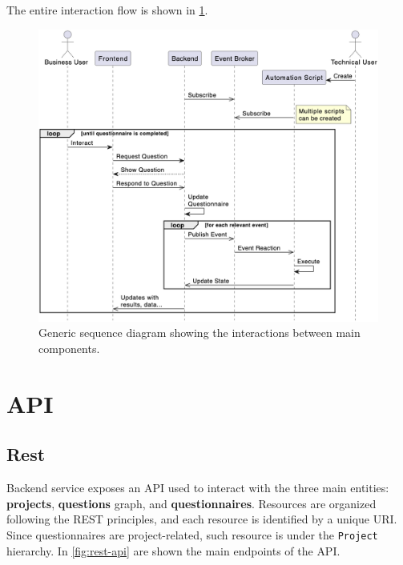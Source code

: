 \documentclass[12pt,a4paper,openright,twoside]{book}
\begin{document}
The entire interaction flow is shown in \cref{fig:sequence}.

\begin{figure}
    \centering
    \includegraphics[width=0.70\linewidth]{figures/diagrams/sequence.png}
    \caption{
        Generic sequence diagram showing the interactions between main components.
    }
    \label{fig:sequence}
\end{figure}



\section{\acs{API}}

\subsection{Rest}

Backend service exposes an \ac{API} used to interact with the three main entities: \textbf{projects}, \textbf{questions} graph, and \textbf{questionnaires}.
%
Resources are organized following the REST principles, and each resource is identified by a unique URI.
%
Since questionnaires are project-related, such resource is under the \texttt{Project} hierarchy.
%
In \cref{fig:rest-api} are shown the main endpoints of the \ac{API}.
\end{document}
